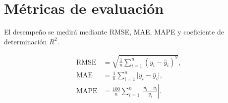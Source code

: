 \section{Métricas de evaluación}

El desempeño se medirá mediante RMSE, MAE, MAPE y coeficiente de determinación $R^2$.

\begin{align}
\mathrm{RMSE} &= \sqrt{\frac{1}{n}\sum_{i=1}^{n}(y_i-\hat{y}_i)^2},\\
\mathrm{MAE} &= \frac{1}{n}\sum_{i=1}^{n}\lvert y_i-\hat{y}_i\rvert,\\
\mathrm{MAPE} &= \frac{100}{n}\sum_{i=1}^{n}\left\lvert\frac{y_i-\hat{y}_i}{y_i}\right\rvert.
\end{align}
